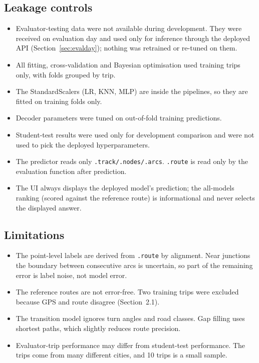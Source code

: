 \documentclass[10pt,a4paper]{article}
\newcommand{\code}[1]{\texttt{\small #1}}
\begin{document}
\subsection{Leakage controls}
\begin{itemize}
  \item Evaluator-testing data were not available during development. They were received on evaluation day and used only for inference through the deployed API (Section~\ref{sec:evalday}); nothing was retrained or re-tuned on them.
  \item All fitting, cross-validation and Bayesian optimisation used training trips only, with folds grouped by trip.
  \item The StandardScalers (LR, KNN, MLP) are inside the pipelines, so they are fitted on training folds only.
  \item Decoder parameters were tuned on out-of-fold training predictions.
  \item Student-test results were used only for development comparison and were not used to pick the deployed hyperparameters.
  \item The predictor reads only \code{.track/.nodes/.arcs}. \code{.route} is read only by the evaluation function after prediction.
  \item The UI always displays the deployed model's prediction; the all-models ranking (scored against the reference route) is informational and never selects the displayed answer.
\end{itemize}
\subsection{Limitations}
\begin{itemize}
  \item The point-level labels are derived from \code{.route} by alignment. Near junctions the boundary between consecutive arcs is uncertain, so part of the remaining error is label noise, not model error.
  \item The reference routes are not error-free. Two training trips were excluded because GPS and route disagree (Section~2.1).
  \item The transition model ignores turn angles and road classes. Gap filling uses shortest paths, which slightly reduces route precision.
  \item Evaluator-trip performance may differ from student-test performance. The trips come from many different cities, and 10 trips is a small sample.
\end{itemize}
\end{document}
